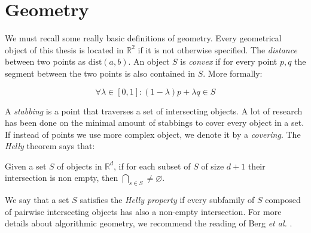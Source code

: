 \section{Geometry}

We must recall some really basic definitions of geometry. Every geometrical object of this thesis is located in $\mathbb{R}^2$ if it is not otherwise specified. The \emph{distance} between two points as $\text{dist}(a,b)$. An object $S$ is \emph{convex} if for every point $p,q$ the segment between the two points is also contained in $S$. More formally:

$$\forall \lambda \in [0,1]: (1-\lambda)p + \lambda q \in S$$

A \emph{stabbing} is a point that traverses a set of intersecting objects. A lot of research has been done \cite{schlipf2013stabbing} on the minimal amount of stabbings to cover every object in a set. If instead of points we use more complex object, we denote it by a \emph{covering}. The \emph{Helly} theorem says that:

\begin{_theo}
  Given a set $S$ of objects in $\mathbb{R}^d$, if for each subset of $S$ of
  size $d+1$ their intersection is non empty, then $\bigcap_{s \in S} \neq
  \varnothing$.
\end{_theo}

We say that a set $S$ satisfies the \emph{Helly property} if every subfamily of $S$ composed of pairwise intersecting objects has also a non-empty intersection. For more details about algorithmic geometry, we recommend the reading of Berg \textit{et al.} \cite{bergComputationalGeometryAlgorithms2008}.
